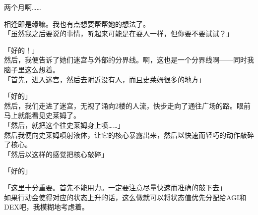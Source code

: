 两个月啊……

相逢即是缘嘛。我也有点想要帮帮她的想法了。\\

「虽然我之后要说的事情，听起来可能是在耍人一样，但你要不要试试？」

「好的！」\\

然后，我便告诉了她们迷宫与外部的分界线。啊，这也是一个分界线啊——同时我脑子里这么想着。\\

「首先，进入迷宫，然后去附近没有人，而且史莱姆很多的地方」

「好的」\\

然后，我们走进了迷宫，无视了涌向2楼的人流，快步走向了通往广场的路。眼前马上就能看见史莱姆了。\\

「然后，就把这个往史莱姆身上喷……」\\

然后我便向史莱姆喷射液体，让它的核心暴露出来，然后以快速而轻巧的动作敲碎了核心。\\

「然后以这样的感觉把核心敲碎」

「好的」

「这里十分重要。首先不能用力。一定要注意尽量快速而准确的敲下去」\\

如果行动会使得对应的状态上升的话，这么做就可以将状态值优先分配给AGI和DEX吧，我模糊地考虑着。\\


